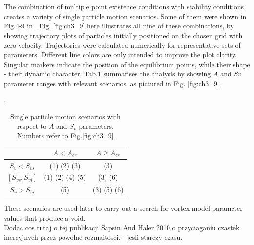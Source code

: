 \documentclass[../main.tex]{subfiles}
\begin{document}
The combination of multiple point existence conditions with stability conditions creates a variety of single particle motion scenarios. Some of them were shown in Fig.4-9 in \citet{Marcu1995}. Fig. \ref{fig:ch3_9} here illustrates all nine of these combinations, by showing trajectory plots of particles initially positioned on the chosen grid with zero velocity. Trajectories were calculated numerically for representative sets of parameters. Different line colors are only intended to improve the plot clarity. Singular markers indicate the position of the equilibrium points, while their shape - their dynamic character. Tab.\ref{tab:ch3_4} summarises the analysis by showing $A$ and $Sv$ parameter ranges with relevant scenarios, as pictured in Fig. \ref{fig:ch3_9}.

\begin{table}
\small
\tabcolsep=0.2cm
\caption{Single particle motion scenarios with respect to $A$ and $S_v$ parameters. Numbers refer to Fig.\ref{fig:ch3_9}}.
\centering
\begin{tabular}{|c|c|c|}
\hline 
 & $A < A_{cr}$ & $A \geq A_{cr}$\\
\hline
$S_v<S_{v s}$ &(1) (2) (3) & (3)\\
\hline
$[S_{v s},S_{v i}]$ & (1) (2) (4) (5)& (3) (6)\\
\hline
$S_v>S_{v i}$ & (5) & (3) (5) (6)\\
\hline
\end{tabular}
\label{tab:ch3_4}
\end{table}

These scenarios are used later to carry out a search for vortex model parameter values that produce a void. 
\\
Dodac cos tutaj o tej publikacji Sapsin And Haler 2010 o przyciaganiu czastek inercyjnych przez powolne rozmaitosci. - jesli starczy czasu.
\end{document}
